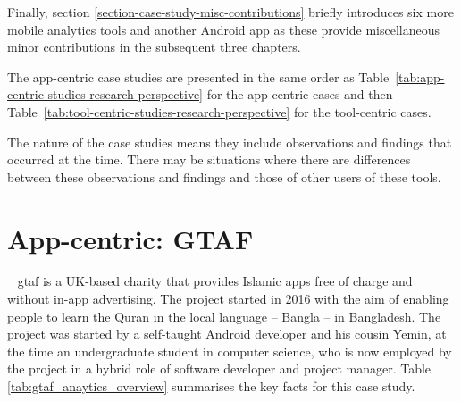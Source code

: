 Finally, section \ref{section-case-study-misc-contributions} briefly introduces six more mobile analytics tools and another Android app as these provide miscellaneous minor contributions in the subsequent three chapters.
    
The app-centric case studies are presented in the same order as Table~\ref{tab:app-centric-studies-research-perspective} for the app-centric cases and then Table~\ref{tab:tool-centric-studies-research-perspective} for the tool-centric cases. 

The nature of the case studies means they include observations and findings that occurred at the time. There may be situations where there are differences between these observations and findings and those of other users of these tools. 
\clearpage




\section{App-centric: GTAF}~\label{case-study-overview-gtaf}
\Acrfull{gtaf} is a UK-based charity that provides Islamic apps free of charge and without in-app advertising. The project started in 2016 with the aim of enabling people to learn the Quran in the local language -- Bangla -- in Bangladesh. The project was started by a self-taught Android developer and his cousin Yemin, at the time an undergraduate student in computer science, who is now employed by the project in a hybrid role of software developer and project manager. Table \ref{tab:gtaf_anaytics_overview} summarises the key facts for this case study.

